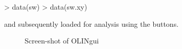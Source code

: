 \documentclass[a4paper,11pt]{article}
\begin{document}
\begin{Schunk}
\begin{Sinput}
> data(sw)
> data(sw.xy)
\end{Sinput}
\end{Schunk}
and subsequently loaded for analysis using the  buttons.

   
\begin{figure}
\centering
\centering
{}
\caption{Screen-shot of OLINgui}
\label{fgbg}
\end{figure}
\end{document}
